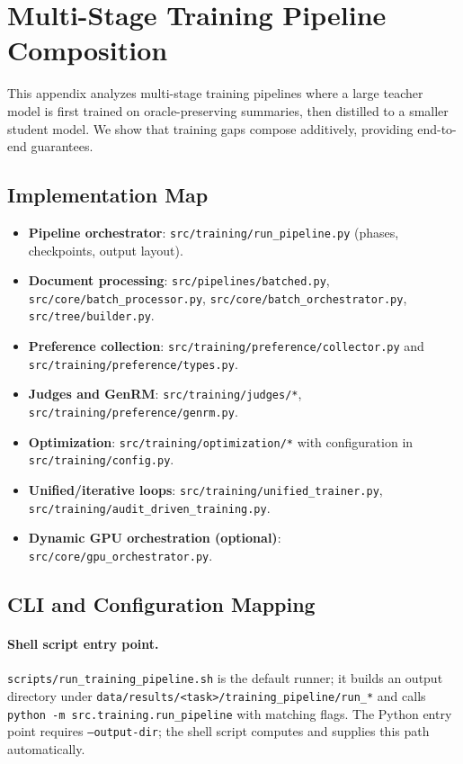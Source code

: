 \section{Multi-Stage Training Pipeline Composition}
\label{app:pipeline}

This appendix analyzes multi-stage training pipelines where a large teacher model is first trained on oracle-preserving summaries, then distilled to a smaller student model. We show that training gaps compose additively, providing end-to-end guarantees.

\subsection{Implementation Map}
\begin{itemize}[nosep]
    \item \textbf{Pipeline orchestrator}: \texttt{src/training/run\_pipeline.py} (phases, checkpoints, output layout).
    \item \textbf{Document processing}: \texttt{src/pipelines/batched.py}, \texttt{src/core/batch\_processor.py}, \texttt{src/core/batch\_orchestrator.py}, \texttt{src/tree/builder.py}.
    \item \textbf{Preference collection}: \texttt{src/training/preference/collector.py} and \texttt{src/training/preference/types.py}.
    \item \textbf{Judges and GenRM}: \texttt{src/training/judges/*}, \texttt{src/training/preference/genrm.py}.
    \item \textbf{Optimization}: \texttt{src/training/optimization/*} with configuration in \texttt{src/training/config.py}.
    \item \textbf{Unified/iterative loops}: \texttt{src/training/unified\_trainer.py}, \texttt{src/training/audit\_driven\_training.py}.
    \item \textbf{Dynamic GPU orchestration (optional)}: \texttt{src/core/gpu\_orchestrator.py}.
\end{itemize}

\subsection{CLI and Configuration Mapping}

\paragraph{Shell script entry point.}
\texttt{scripts/run\_training\_pipeline.sh} is the default runner; it builds an
output directory under \texttt{data/results/<task>/training\_pipeline/run\_*}
and calls \texttt{python -m src.training.run\_pipeline} with matching flags.
The Python entry point requires \texttt{--output-dir}; the shell script computes
and supplies this path automatically.


